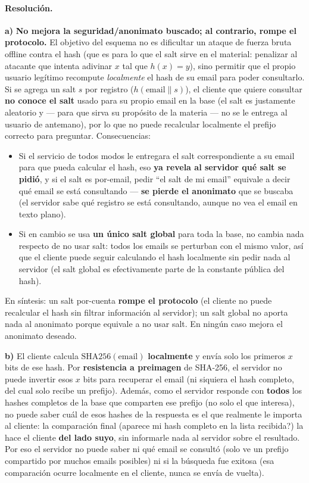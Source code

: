 \paragraph{Resolución.}

\textbf{a)} \textbf{No mejora la seguridad/anonimato buscado; al contrario, rompe el
protocolo.} El objetivo del esquema no es dificultar un ataque de fuerza bruta offline
contra el hash (que es para lo que el salt sirve en el material: penalizar al atacante
que intenta adivinar $x$ tal que $h(x)=y$), sino permitir que el propio usuario legítimo
recompute \emph{localmente} el hash de su email para poder consultarlo. Si se agrega un
salt $s$ por registro ($h(\text{email}\|s)$), el cliente que quiere consultar
\textbf{no conoce el salt} usado para su propio email en la base (el salt es
justamente aleatorio y --- para que sirva su propósito de la materia --- no se le
entrega al usuario de antemano), por lo que no puede recalcular localmente el prefijo
correcto para preguntar. Consecuencias:
\begin{itemize}
  \item Si el servicio de todos modos le entregara el salt correspondiente a su email
  para que pueda calcular el hash, eso \textbf{ya revela al servidor qué salt se pidió},
  y si el salt es por-email, pedir ``el salt de mi email'' equivale a decir qué email se
  está consultando --- \textbf{se pierde el anonimato} que se buscaba (el servidor sabe
  qué registro se está consultando, aunque no vea el email en texto plano).
  \item Si en cambio se usa \textbf{un único salt global} para toda la base, no cambia
  nada respecto de no usar salt: todos los emails se perturban con el mismo valor, así
  que el cliente puede seguir calculando el hash localmente sin pedir nada al servidor
  (el salt global es efectivamente parte de la constante pública del hash).
\end{itemize}
En síntesis: un salt por-cuenta \textbf{rompe el protocolo} (el cliente no puede
recalcular el hash sin filtrar información al servidor); un salt global no aporta nada
al anonimato porque equivale a no usar salt. En ningún caso mejora el anonimato deseado.

\textbf{b)} El cliente calcula $\mathrm{SHA256}(\text{email})$ \textbf{localmente} y
envía solo los primeros $x$ bits de ese hash. Por \textbf{resistencia a preimagen} de
SHA-256, el servidor no puede invertir esos $x$ bits para recuperar el email (ni
siquiera el hash completo, del cual solo recibe un prefijo). Además, como el servidor
responde con \textbf{todos} los hashes completos de la base que comparten ese prefijo
(no solo el que interesa), no puede saber cuál de esos hashes de la respuesta es el que
realmente le importa al cliente: la comparación final (\textquestiondown{}aparece mi hash completo en la
lista recibida?) la hace el cliente \textbf{del lado suyo}, sin informarle nada al
servidor sobre el resultado. Por eso el servidor no puede saber ni qué email se
consultó (solo ve un prefijo compartido por muchos emails posibles) ni si la búsqueda
fue exitosa (esa comparación ocurre localmente en el cliente, nunca se envía de vuelta).

